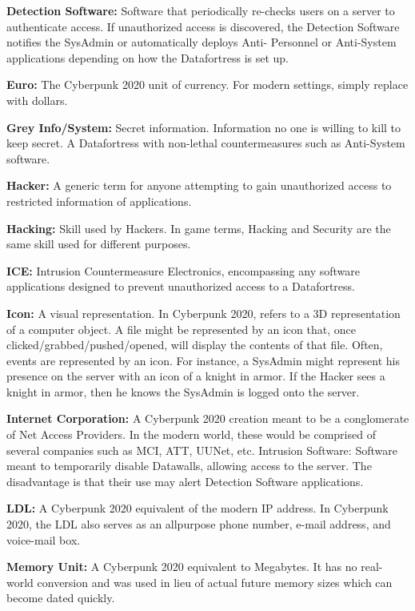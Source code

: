 \documentclass[11pt,twoside,a4paper]{article}
\newenvironment{local_itemize}{
\begin{itemize}
     \setlength{\itemsep}{1pt}
     \setlength{\parskip}{0pt}
     \setlength{\parsep}{0pt}}
{\end{itemize}
}
\begin{document}
\begin{multicols*}{2}
\begin{local_itemize}
	\item[] \textbf{Detection Software: } Software that periodically re-checks users on a server to authenticate access. If unauthorized access is discovered, the Detection Software notifies the SysAdmin or automatically deploys Anti- Personnel or Anti-System applications depending on how the Datafortress is set up.
	\item[] \textbf{Euro: } The Cyberpunk 2020 unit of currency. For modern settings, simply replace with dollars.
	\item[] \textbf{Grey Info/System: } Secret information. Information no one is willing to kill to keep secret. A Datafortress with non-lethal countermeasures such as Anti-System software.
	\item[] \textbf{Hacker: } A generic term for anyone attempting to gain unauthorized access to restricted information of applications.
	\item[] \textbf{Hacking: } Skill used by Hackers. In game terms, Hacking and Security are the same skill used for different purposes.
	\item[] \textbf{ICE: } Intrusion Countermeasure Electronics, encompassing any software applications designed to prevent unauthorized access to a Datafortress.
	\item[] \textbf{Icon: } A visual representation. In Cyberpunk 2020, refers to a 3D representation of a computer object. A file might be represented by an icon that, once clicked/grabbed/pushed/opened, will display the contents of that file. Often, events are represented by an icon. For instance, a SysAdmin might represent his presence on the server with an icon of a knight in armor. If the Hacker sees a knight in armor, then he knows the SysAdmin is logged onto the server.
	\item[] \textbf{Internet Corporation: } A Cyberpunk 2020 creation meant to be a conglomerate of Net Access Providers. In the modern world, these would be comprised of several companies such as MCI, ATT, UUNet, etc. Intrusion Software: Software meant to temporarily disable Datawalls, allowing access to the server. The disadvantage is that their use may alert Detection Software applications.
	\item[] \textbf{LDL: } A Cyberpunk 2020 equivalent of the modern IP address. In Cyberpunk 2020, the LDL also serves as an allpurpose phone number, e-mail address, and voice-mail box.
	\item[] \textbf{Memory Unit: } A Cyberpunk 2020 equivalent to Megabytes. It has no real-world conversion and was used in lieu of actual future memory sizes which can become dated quickly.

\end{local_itemize}
\end{multicols*}
\end{document}
